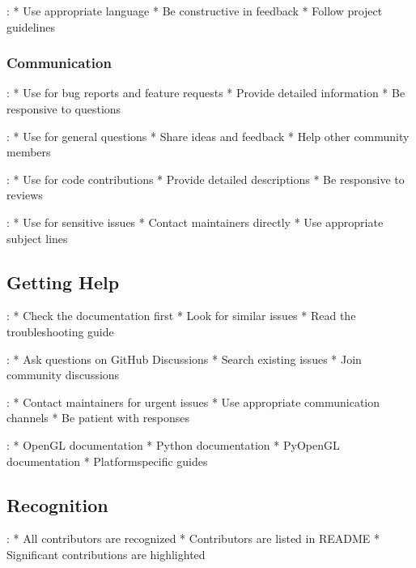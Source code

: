 \documentclass[a4paper,10pt,english,openany,oneside]{sphinxmanual}
\begin{document}
\sphinxAtStartPar
{}:
* Use appropriate language
* Be constructive in feedback
* Follow project guidelines


\subsubsection{Communication}
\label{\detokenize{contributing:communication}}
\sphinxAtStartPar
{}:
* Use for bug reports and feature requests
* Provide detailed information
* Be responsive to questions

\sphinxAtStartPar
{}:
* Use for general questions
* Share ideas and feedback
* Help other community members

\sphinxAtStartPar
{}:
* Use for code contributions
* Provide detailed descriptions
* Be responsive to reviews

\sphinxAtStartPar
{}:
* Use for sensitive issues
* Contact maintainers directly
* Use appropriate subject lines


\subsection{Getting Help}
\label{\detokenize{contributing:getting-help}}
\sphinxAtStartPar
{}:
* Check the documentation first
* Look for similar issues
* Read the troubleshooting guide

\sphinxAtStartPar
{}:
* Ask questions on GitHub Discussions
* Search existing issues
* Join community discussions

\sphinxAtStartPar
{}:
* Contact maintainers for urgent issues
* Use appropriate communication channels
* Be patient with responses

\sphinxAtStartPar
{}:
* OpenGL documentation
* Python documentation
* PyOpenGL documentation
* Platform\sphinxhyphen{}specific guides


\subsection{Recognition}
\label{\detokenize{contributing:recognition}}
\sphinxAtStartPar
{}:
* All contributors are recognized
* Contributors are listed in README
* Significant contributions are highlighted
\end{document}
